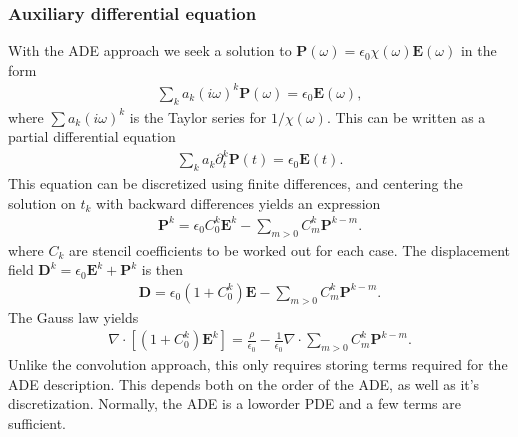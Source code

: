 \documentclass[letterpaper,10pt,english]{sphinxmanual}
\begin{document}
\subsubsection{Auxiliary differential equation}
\label{\detokenize{Solvers/Electrostatics:auxiliary-differential-equation}}
\sphinxAtStartPar
With the ADE approach we seek a solution to \(\mathbf{P}(\omega) = \epsilon_0\chi(\omega)\mathbf{E}(\omega)\) in the form
\begin{equation*}
\begin{split}\sum_k a_k(i\omega)^k\mathbf{P}(\omega) = \epsilon_0\mathbf{E}(\omega),\end{split}
\end{equation*}
\sphinxAtStartPar
where \(\sum a_k(i\omega)^k\) is the Taylor series for \(1/\chi(\omega)\).
This can be written as a partial differential equation
\begin{equation*}
\begin{split}\sum_{k}a_k\partial_t^k\mathbf{P}(t) = \epsilon_0\mathbf{E}(t).\end{split}
\end{equation*}
\sphinxAtStartPar
This equation can be discretized using finite differences, and centering the solution on \(t_k\) with backward differences yields an expression
\begin{equation*}
\begin{split}\mathbf{P}^k = \epsilon_0C_0^k\mathbf{E}^k - \sum_{m>0} C_m^k\mathbf{P}^{k-m}.\end{split}
\end{equation*}
\sphinxAtStartPar
where \(C_k\) are stencil coefficients to be worked out for each case.
The displacement field \(\mathbf{D}^k = \epsilon_0 \mathbf{E}^k + \mathbf{P}^k\) is then
\begin{equation*}
\begin{split}\mathbf{D} = \epsilon_0(1 + C_0^k)\mathbf{E} - \sum_{m>0} C_m^k\mathbf{P}^{k-m}.\end{split}
\end{equation*}
\sphinxAtStartPar
The Gauss law yields
\begin{equation*}
\begin{split}\nabla\cdot\left[\left(1 + C_0^k\right)\mathbf{E}^k\right] = \frac{\rho}{\epsilon_0} - \frac{1}{\epsilon_0}\nabla\cdot\sum_{m>0} C_m^k\mathbf{P}^{k-m}.\end{split}
\end{equation*}
\sphinxAtStartPar
Unlike the convolution approach, this only requires storing terms required for the ADE description.
This depends both on the order of the ADE, as well as it’s discretization.
Normally, the ADE is a low\sphinxhyphen{}order PDE and a few terms are sufficient.
\end{document}
